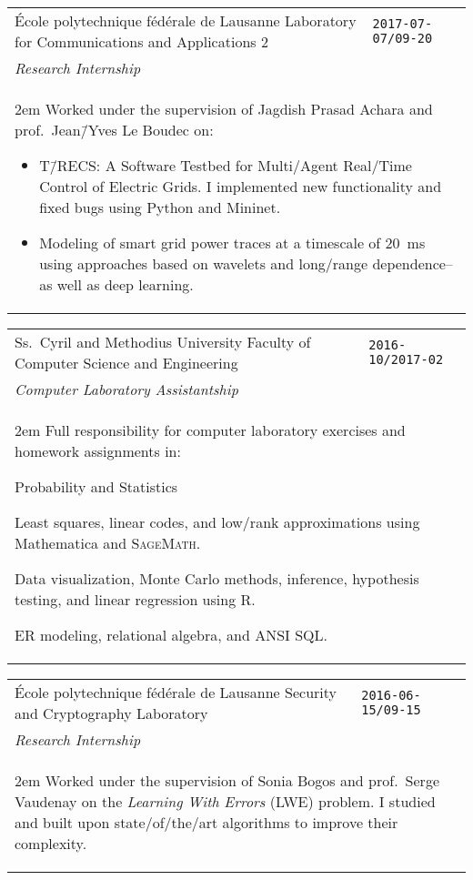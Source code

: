 \documentclass[version=last, paper=A4, DIV=12, toc=bibliography]{scrartcl}%
\newcommand*{\WorkEntry}[4]{%
  \noindent%
  \begin{tabular}{p{.7\textwidth-2\tabcolsep}>{\raggedleft\arraybackslash}p{.3\textwidth-2\tabcolsep}}
    \textsf{#2} & \Verb+#1+\\
    \textit{#3} &\\
    \multicolumn{2}{p{\textwidth-2\tabcolsep}}{\begin{addmargin}{2em}\small#4\end{addmargin}}
  \end{tabular}%
}
\begin{document}
\WorkEntry{2017-07-07/09-20}{%
  École polytechnique fédérale de Lausanne\newline%
  Laboratory for Communications and Applications 2%
}{%
  Research Internship%
}{%
  Worked under the supervision of Jagdish Prasad Achara and prof.\
  Jean\=/Yves Le Boudec on:
  \begin{itemize}[noitemsep, leftmargin=*]
  \item T\=/RECS\@: A Software Testbed for Multi\-/Agent Real\-/Time
    Control of Electric Grids.  I implemented new functionality and
    fixed bugs using Python and Mininet.
  \item Modeling of smart grid power traces at a timescale of
    \SI{20}{\ms} using approaches based on wavelets and long\-/range
    dependence\--- as well as deep learning.
  \end{itemize}%
}

\WorkEntry{2016-10/2017-02}{%
  Ss.\ Cyril and Methodius University\newline%
  Faculty of Computer Science and Engineering%
}{%
  Computer Laboratory Assistantship%
}{%
  Full responsibility for computer laboratory exercises and homework
  assignments in:
  \begin{labeling}{Probability and Statistics}
  \item[Linear Algebra] Least squares, linear codes, and low\-/rank
    approximations using Mathematica\textsuperscript{\textregistered}
    and \textsc{SageMath}.
  \item[Probability and Statistics] Data visualization, Monte Carlo
    methods, inference, hypothesis testing, and linear regression
    using R.
  \item[Databases] ER modeling, relational algebra, and ANSI SQL\@.
  \end{labeling}%
}

\WorkEntry{2016-06-15/09-15}{%
  École polytechnique fédérale de Lausanne\newline%
  Security and Cryptography Laboratory%
}{Research Internship}{%
  Worked under the supervision of Sonia Bogos and prof.\ Serge
  Vaudenay on the \emph{Learning With Errors} (LWE) problem.  I
  studied and built upon state\-/of\-/the\-/art algorithms to improve
  their complexity.%
}

\end{document}
